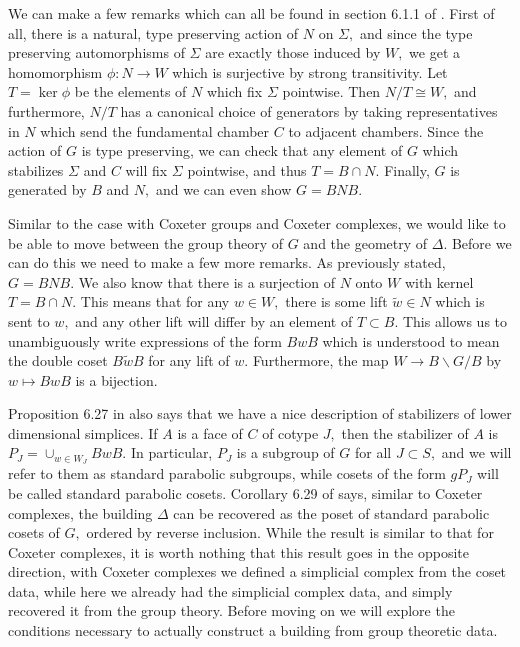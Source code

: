 \documentclass[class=book, crop=false,12 pt]{standalone}
\begin{document}
We can make a few remarks which can all be found in section 6.1.1 of \cite{buildings}. First of all, there is a natural, type preserving action of $N$ on $\Sigma,$ and since the type preserving automorphisms of $\Sigma$ are exactly those induced by $W,$ we get a homomorphism $\phi:N\to W$ which is surjective by strong transitivity. Let $T=\ker \phi$ be the elements of $N$ which fix $\Sigma$ pointwise. Then $N/T\cong W,$ and furthermore, $N/T$ has a canonical choice of generators by taking representatives in $N$ which send the fundamental chamber $C$ to adjacent chambers. Since the action of $G$ is type preserving, we can check that any element of $G$ which stabilizes $\Sigma$ and $C$ will fix $\Sigma$ pointwise, and thus $T=B\cap N.$ Finally, $G$ is generated by $B$ and $N,$ and we can even show $G=BNB.$

Similar to the case with Coxeter groups and Coxeter complexes, we would like to be able to move between the group theory of $G$ and the geometry of $\Delta.$ Before we can do this we need to make a few more remarks. As previously stated, $G=BNB.$ We also know that there is a surjection of $N$ onto $W$ with kernel $T=B\cap N.$ This means that for any $w\in W,$ there is some lift $\tilde{w}\in N$ which is sent to $w,$ and any other lift will differ by an element of $T\subset B.$ This allows us to unambiguously write expressions of the form $BwB$ which is understood to mean the double coset $B\tilde{w}B$ for any lift of $w.$ Furthermore, the map $W\to B\backslash G/B$ by $w\mapsto BwB$ is a bijection.

Proposition 6.27 in \cite{buildings} also says that we have a nice description of stabilizers of lower dimensional simplices. If $A$ is a face of $C$ of cotype $J,$ then the stabilizer of $A$ is $P_J=\cup_{w\in W_J}BwB.$ In particular, $P_J$ is a subgroup of $G$ for all $J\subset S,$ and we will refer to them as standard parabolic subgroups, while cosets of the form $gP_J$ will be called standard parabolic cosets. Corollary 6.29 of \cite{buildings} says, similar to Coxeter complexes, the building $\Delta$ can be recovered as the poset of standard parabolic cosets of $G,$ ordered by reverse inclusion. While the result is similar to that for Coxeter complexes, it is worth nothing that this result goes in the opposite direction, with Coxeter complexes we defined a simplicial complex from the coset data, while here we already had the simplicial complex data, and simply recovered it from the group theory. Before moving on we will explore the conditions necessary to actually construct a building from group theoretic data.
\end{document}
